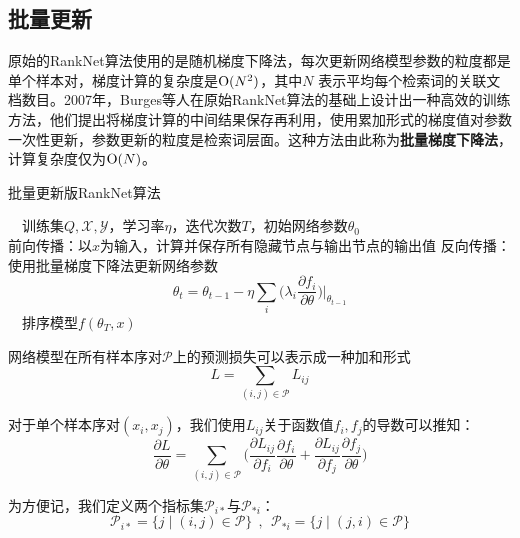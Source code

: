 \subsection{批量更新}
原始的RankNet算法使用的是随机梯度下降法，每次更新网络模型参数的粒度都是单个样本对，梯度计算的复杂度是$\operatorname{\mathrm{O}}(N^2)$，其中$N$ 表示平均每个检索词的关联文档数目。2007年，Burges等人\cite{burges2007learning}在原始RankNet算法的基础上设计出一种高效的训练方法，他们提出将梯度计算的中间结果保存再利用，使用累加形式的梯度值对参数一次性更新，参数更新的粒度是检索词层面。这种方法由此称为\textbf{批量梯度下降法}，计算复杂度仅为$\operatorname{\mathrm{O}}(N)$。

\begin{algorithm}[htbp]
        \caption{批量更新版RankNet算法}
        \begin{algorithmic}
            \REQUIRE ~~训练集${Q,\mathcal{X},\mathcal{Y}}$，学习率$\eta$，迭代次数$T$，初始网络参数$\theta_0$ \\
                \STATE 前向传播：以$x$为输入，计算并保存所有隐藏节点与输出节点的输出值
                \ENDFOR
                \STATE 反向传播：使用批量梯度下降法更新网络参数
                \[
                  \theta_t = \theta_{t-1} - \eta \sum\limits_i \Big(\lambda_i \frac{\partial f_i}{\partial \theta}\Big)\Big|_{\theta_{t-1}}
                \]
            \ENDFOR
            \ENDFOR
            \ENSURE ~~排序模型$f(\theta_T,x)$
        \end{algorithmic}
\end{algorithm}

网络模型在所有样本序对$\mathscr P$上的预测损失可以表示成一种加和形式
\begin{equation}
    L = \sum\limits_{(i,j)\in \mathscr P} L_{ij}
\end{equation}

对于单个样本序对$(x_i,x_j)$，我们使用$L_{ij}$关于函数值$f_i,f_j$的导数可以推知：
\begin{equation}\label{eq:ranknet-batchgradient}
    \frac{\partial L}{\partial \theta} = \sum\limits_{(i,j)\in \mathscr P} \big(\frac{\partial L_{ij}}{\partial f_i} \frac{\partial f_i}{\partial \theta} + \frac{\partial L_{ij}}{\partial f_j} \frac{\partial f_j}{\partial \theta} \big)
\end{equation}

为方便记，我们定义两个指标集$\mathscr P_{i*}$与$\mathscr P_{*i}$：
\begin{equation}
    \mathscr P_{i*} = \{j\mid (i,j)\in \mathscr P\}~~,~~\mathscr P_{*i} = \{j\mid (j,i)\in \mathscr P\}
\end{equation}

